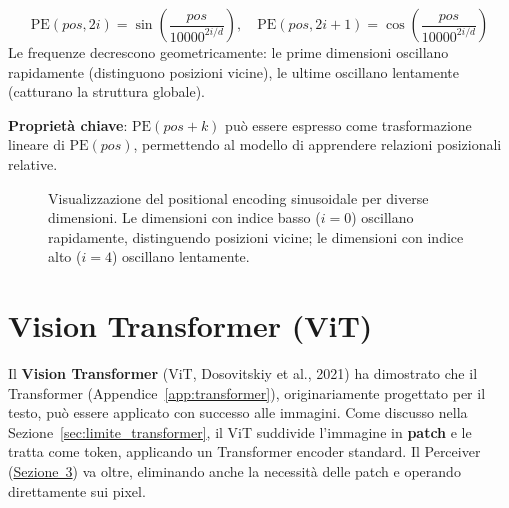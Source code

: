\documentclass[12pt,a4paper]{article}
\begin{document}
\begin{formulabox}
\[
    \text{PE}(pos, 2i) = \sin\!\left(\frac{pos}{10000^{2i/d}}\right), \quad
    \text{PE}(pos, 2i+1) = \cos\!\left(\frac{pos}{10000^{2i/d}}\right)
\]
Le frequenze decrescono geometricamente: le prime dimensioni oscillano rapidamente (distinguono posizioni vicine), le ultime oscillano lentamente (catturano la struttura globale).

\textbf{Propriet\`a chiave}: $\text{PE}(pos + k)$ pu\`o essere espresso come trasformazione lineare di $\text{PE}(pos)$, permettendo al modello di apprendere relazioni posizionali relative.
\end{formulabox}

\begin{figure}[H]
\centering
{}
\caption{Visualizzazione del positional encoding sinusoidale per diverse dimensioni. Le dimensioni con indice basso ($i=0$) oscillano rapidamente, distinguendo posizioni vicine; le dimensioni con indice alto ($i=4$) oscillano lentamente.}
\label{fig:pe_sinusoidal}
\end{figure}



\newpage
\section{Vision Transformer (ViT)} \label{app:vit}

Il \textbf{Vision Transformer} (ViT, Dosovitskiy et al., 2021) ha dimostrato che il Transformer (Appendice~\ref{app:transformer}), originariamente progettato per il testo, pu\`o essere applicato con successo alle immagini. Come discusso nella Sezione~\ref{sec:limite_transformer}, il ViT suddivide l'immagine in \textbf{patch} e le tratta come token, applicando un Transformer encoder standard. Il Perceiver (\hyperref[sec:architettura]{Sezione~3}) va oltre, eliminando anche la necessit\`a delle patch e operando direttamente sui pixel.
\end{document}
